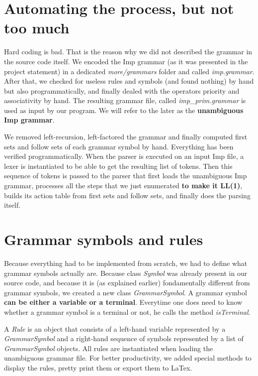 
\section{Automating the process, but not too much}

Hard coding is bad. That is the reason why we did not described the grammar in the source code itself.
We encoded the Imp grammar (as it was presented in the project statement) in a dedicated \textit{more/grammars} folder and called \textit{imp.grammar}.
After that, we checked for useless rules and symbols (and found nothing) by hand but also programmatically, and finally dealed with
the operators priority and associativity by hand. The resulting grammar file, called \textit{imp\_prim.grammar} is used as input by our program.
We will refer to the later as the \textbf{unambiguous Imp grammar}.

We removed left-recursion, left-factored the grammar and finally computed first sets and follow sets of each grammar symbol by hand. 
Everything has been verified programmatically. When the parser is executed on an input Imp file, a lexer is instantiated to be able
to get the resulting list of tokens. Then this sequence of tokens is passed to the parser that first loads the unambiguous Imp grammar,
processes all the steps that we just enumerated \textbf{to make it LL(1)}, 
builds its action table from first sets and follow sets, and finally does the parsing itself.

\section{Grammar symbols and rules}

Because everything had to be implemented from scratch, we had to define what grammar symbols actually are. Because class \textit{Symbol}
was already present in our source code, and because it is (as explained earlier) fondamentally different from grammar symbols,
we created a new class \textit{GrammarSymbol}. A grammar symbol \textbf{can be either a variable or a terminal}. Everytime one does need
to know whether a grammar symbol is a terminal or not, he calls the method \textit{isTerminal}.

A \textit{Rule} is an object that consists of a left-hand variable represented by a \textit{GrammarSymbol} and a right-hand sequence
of symbols represented by a list of \textit{GrammarSymbol} objects. All rules are instantiated when loading the unambiguous grammar file.
For better productivity, we added special methods to display the rules, pretty print them or export them to LaTex.

